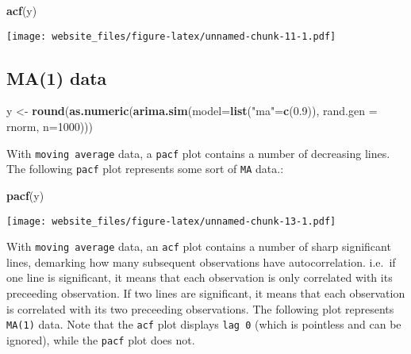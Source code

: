 \documentclass[]{book}
\newenvironment{Shaded}{\begin{snugshade}}{\end{snugshade}}
\newcommand{\KeywordTok}[1]{\textcolor[rgb]{0.13,0.29,0.53}{\textbf{#1}}}
\newcommand{\DataTypeTok}[1]{\textcolor[rgb]{0.13,0.29,0.53}{#1}}
\newcommand{\DecValTok}[1]{\textcolor[rgb]{0.00,0.00,0.81}{#1}}
\newcommand{\FloatTok}[1]{\textcolor[rgb]{0.00,0.00,0.81}{#1}}
\newcommand{\StringTok}[1]{\textcolor[rgb]{0.31,0.60,0.02}{#1}}
\newcommand{\NormalTok}[1]{#1}
\begin{document}
\begin{Shaded}
\begin{Highlighting}[]
\KeywordTok{acf}\NormalTok{(y)}
\end{Highlighting}
\end{Shaded}

\texttt{[image: website\_files/figure-latex/unnamed-chunk-11-1.pdf]}

\newpage 

\subsection{MA(1) data}\label{ma1-data}

\begin{Shaded}
\begin{Highlighting}[]
\NormalTok{y <-}\StringTok{ }\KeywordTok{round}\NormalTok{(}\KeywordTok{as.numeric}\NormalTok{(}\KeywordTok{arima.sim}\NormalTok{(}\DataTypeTok{model=}\KeywordTok{list}\NormalTok{(}\StringTok{"ma"}\NormalTok{=}\KeywordTok{c}\NormalTok{(}\FloatTok{0.9}\NormalTok{)), }\DataTypeTok{rand.gen =}\NormalTok{ rnorm, }\DataTypeTok{n=}\DecValTok{1000}\NormalTok{)))}
\end{Highlighting}
\end{Shaded}

With \texttt{moving\ average} data, a \texttt{pacf} plot contains a
number of decreasing lines. The following \texttt{pacf} plot represents
some sort of \texttt{MA} data.:

\begin{Shaded}
\begin{Highlighting}[]
\KeywordTok{pacf}\NormalTok{(y)}
\end{Highlighting}
\end{Shaded}

\texttt{[image: website\_files/figure-latex/unnamed-chunk-13-1.pdf]}

\newpage

With \texttt{moving\ average} data, an \texttt{acf} plot contains a
number of sharp significant lines, demarking how many subsequent
observations have autocorrelation. i.e.~if one line is significant, it
means that each observation is only correlated with its preceeding
observation. If two lines are significant, it means that each
observation is correlated with its two preceeding observations. The
following plot represents \texttt{MA(1)} data. Note that the
\texttt{acf} plot displays \texttt{lag\ 0} (which is pointless and can
be ignored), while the \texttt{pacf} plot does not.
\end{document}
